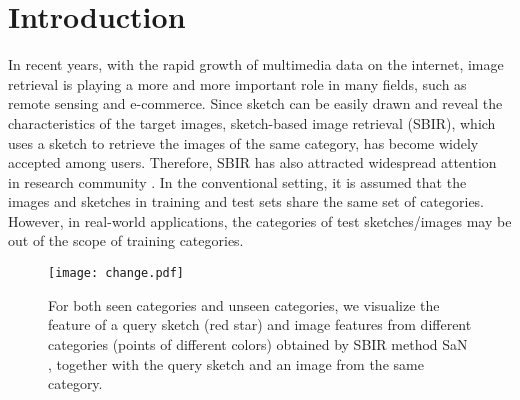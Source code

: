 \documentclass[10pt,twocolumn,letterpaper]{article}
\begin{document}
\section{Introduction}
In recent years, with the rapid growth of multimedia data on the internet, image retrieval is playing a more and more important role in many fields, such as remote sensing and e-commerce. 
Since sketch can be easily drawn and reveal the characteristics of the target images, sketch-based image retrieval (SBIR), which uses a sketch to retrieve the images of the same category, has become widely accepted among users. 
Therefore, SBIR has also attracted widespread attention in research community \cite{del1997visual, cao2010mindfinder, eitz2010evaluation, eitz2010sketch, cao2011edgel, hu2011bag, zhou2012sketch, hu2013performance, cao2013sym, parui2014similarity, james2014reenact, wang2015sketch, saavedra2015sketch, li2016fine, yu2016sketch, qi2016sketch, sangkloy2016sketchy, lu2018learning}. 
In the conventional setting, it is assumed that the images and sketches in training and test sets share the same set of categories.
However, in real-world applications, the categories of test sketches/images may be out of the scope of training categories.

\begin{figure}
\centering
\texttt{[image: change.pdf]}
   \caption{For both seen categories and unseen categories, we visualize the feature of a query sketch (red star) and image features from different categories (points of different colors) obtained by SBIR method SaN \cite{yu2017sketch}, together with the query sketch and an image from the same category.}
\label{fig:inshort}
\vspace{-15pt}
\end{figure}
\end{document}
